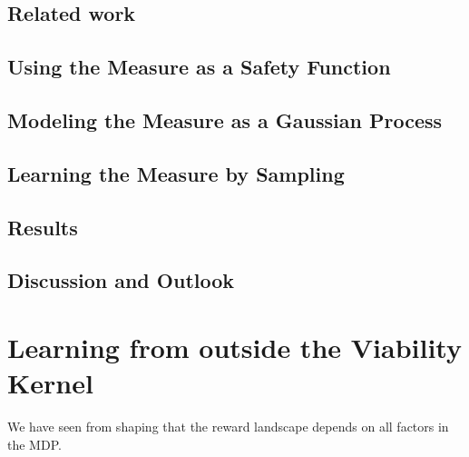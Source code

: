 \subsection{Related work}
\subsection{Using the Measure as a Safety Function}
\subsection{Modeling the Measure as a Gaussian Process}
\subsection{Learning the Measure by Sampling}
\subsection{Results}
\subsection{Discussion and Outlook}

\section{Learning from outside the Viability Kernel}
We have seen from shaping that the reward landscape depends on all factors in the MDP.